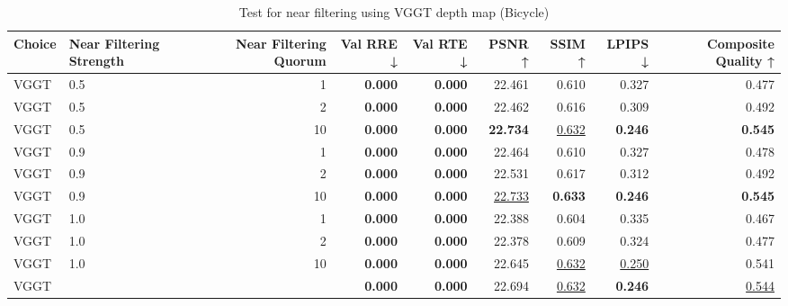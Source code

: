 \begin{table}[H]
\caption{Test for near filtering using VGGT depth map (Bicycle)}
\label{tab:99_near_filtering_gt_cams_bicycle}
\begin{tabular}{llrrrrrrr}
\toprule
Choice & Near Filtering Strength & Near Filtering Quorum & Val RRE ↓ & Val RTE ↓ & PSNR ↑ & SSIM ↑ & LPIPS ↓ & Composite Quality ↑ \\
\midrule
VGGT & 0.5 & 1 & \textbf{0.000} & \textbf{0.000} & 22.461 & 0.610 & 0.327 & 0.477 \\
VGGT & 0.5 & 2 & \textbf{0.000} & \textbf{0.000} & 22.462 & 0.616 & 0.309 & 0.492 \\
VGGT & 0.5 & 10 & \textbf{0.000} & \textbf{0.000} & \textbf{22.734} & \underline{0.632} & \textbf{0.246} & \textbf{0.545} \\
VGGT & 0.9 & 1 & \textbf{0.000} & \textbf{0.000} & 22.464 & 0.610 & 0.327 & 0.478 \\
VGGT & 0.9 & 2 & \textbf{0.000} & \textbf{0.000} & 22.531 & 0.617 & 0.312 & 0.492 \\
VGGT & 0.9 & 10 & \textbf{0.000} & \textbf{0.000} & \underline{22.733} & \textbf{0.633} & \textbf{0.246} & \textbf{0.545} \\
VGGT & 1.0 & 1 & \textbf{0.000} & \textbf{0.000} & 22.388 & 0.604 & 0.335 & 0.467 \\
VGGT & 1.0 & 2 & \textbf{0.000} & \textbf{0.000} & 22.378 & 0.609 & 0.324 & 0.477 \\
VGGT & 1.0 & 10 & \textbf{0.000} & \textbf{0.000} & 22.645 & \underline{0.632} & \underline{0.250} & 0.541 \\
VGGT &  &  & \textbf{0.000} & \textbf{0.000} & 22.694 & \underline{0.632} & \textbf{0.246} & \underline{0.544} \\
\bottomrule
\end{tabular}
\end{table}
